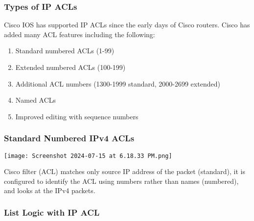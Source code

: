 \documentclass[a4paper]{article}
\begin{document}
    \subsubsection{Types of IP ACLs}
    Cisco IOS has supported IP ACLs since the early days of Cisco routers. Cisco has added many ACL features including the following: 
    \begin{enumerate}
        \item Standard numbered ACLs (1-99)
        \item Extended numbered ACLs (100-199)
        \item Additional ACL numbers (1300-1999 standard, 2000-2699 extended)
        \item Named ACLs
        \item Improved editing with sequence numbers
    \end{enumerate}

    \subsubsection{Standard Numbered IPv4 ACLs}
    
    \texttt{[image: Screenshot 2024-07-15 at 6.18.33 PM.png]}
    
    Cisco filter (ACL) matches only source IP address of the packet (standard), it is configured to identify the ACL using numbers rather than names (numbered), and looks at the IPv4 packets. 

    \subsubsection{List Logic with IP ACL}
\end{document}
